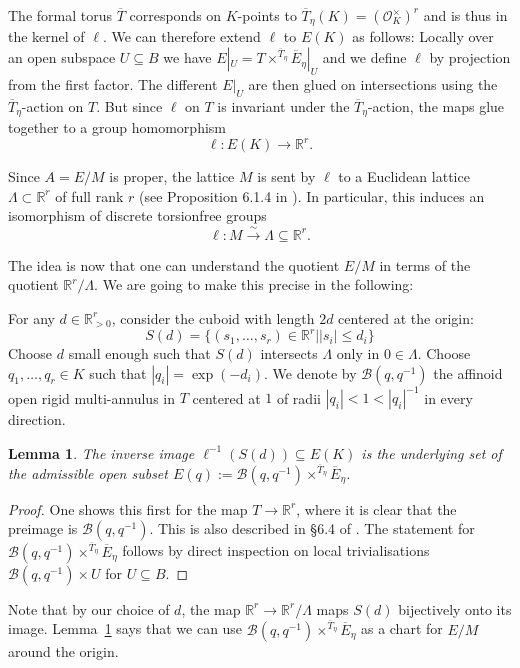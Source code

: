 \documentclass[10pt,oneside]{amsart}
\newtheorem{lemma}[theorem]{Lemma}
\theoremstyle{definition}
\begin{document}
		The formal torus $\overline{T}$ corresponds on $K$-points to $\overline{T}_\eta(K) = (\mathcal O_K^\times)^r$ and is thus in the kernel of $\ell$. We can therefore extend $\ell$ to $E(K)$ as follows: Locally over an open subspace $U\subseteq B$ we have $E|_U = T\times^{\overline{T}_\eta}\overline{E}_\eta|_{U}$ and we define $\ell$ by projection from the first factor. The different $E|_U$ are then glued on intersections using the $\overline{T}_\eta$-action on $T$. But since $\ell$ on $T$ is invariant under the $\overline{T}_\eta$-action, the maps glue together to a group homomorphism 
	\[\ell:E(K)\rightarrow \mathbb R^r.\]
	
	Since $A=E/M$ is proper, the lattice $M$ is sent by $\ell$ to a Euclidean lattice $\Lambda \subset \mathbb R^r$ of full rank $r$ (see Proposition 6.1.4 in \cite{rigid geometry of curves}). In particular, this induces an isomorphism of discrete torsionfree groups
	\[\ell:M\xrightarrow{\sim} \Lambda\subseteq\mathbb R^r.\]
	
	The idea is now that one can understand the quotient $E/M$ in terms of the quotient $\mathbb R^r/\Lambda$. We are going to make this precise in the following:
	
	For any $d\in \mathbb R_{> 0}^r$, consider the cuboid with length $2d$ centered at the origin:
	\[S(d) = \{(s_1,\dots,s_r)\in \mathbb R^r | |s_i|\leq d_i \}\]
	Choose $d$ small enough such that $S(d)$ intersects $\Lambda$ only in $0\in \Lambda$. Choose
	 $q_1,\dots,q_r\in K$ such that $|q_i|=\exp(-d_i)$. We denote by $\mathcal B(q,q^{-1})$ the affinoid open rigid multi-annulus in $T$ centered at $1$ of radii $|q_i|< 1 < |q_i|^{-1}$ in every direction.
	
	\begin{lemma}\label{cube around origin gives local chart for E/M}
		The inverse image $\ell^{-1}(S(d))\subseteq E(K)$ is the underlying set of the admissible open subset $E(q):=\mathcal B(q,q^{-1})\times^{\overline{T}_\eta}\overline{E}_\eta$.
	\end{lemma}
	\begin{proof}
		One shows this first for the map $T\rightarrow \mathbb R^r$, where it is clear that the preimage is $\mathcal B(q,q^{-1})$. This is also described in \S 6.4 of \cite{FvdP}. The statement for $\mathcal B(q,q^{-1})\times^{\overline{T}_\eta}\overline{E}_\eta$ follows by direct inspection on local trivialisations $\mathcal B(q,q^{-1})\times U$ for $U\subseteq B$.
	\end{proof}
	
	
	Note that by our choice of $d$, the map $\mathbb R^r\rightarrow \mathbb R^r/\Lambda$ maps $S(d)$ bijectively onto its image. 
	Lemma~\ref{cube around origin gives local chart for E/M} says that we can use $\mathcal B(q,q^{-1})\times^{\overline{T}_\eta}\overline{E}_\eta$ as a chart for $E/M$ around the origin.
	
\end{document}
